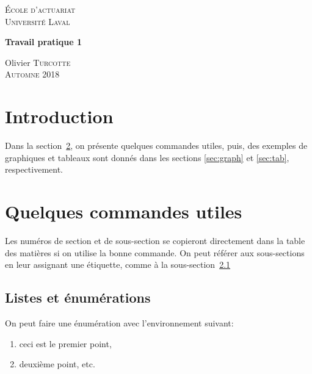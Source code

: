 \documentclass{article}\usepackage[]{graphicx}\usepackage[]{color}
\begin{document}
\thispagestyle{empty}
\begin{center}

\vspace{3cm}

\textsc{\Large École d'actuariat}\\
\textsc{\Large Université Laval}\\[0.5cm]

\vspace{5cm}

{ \LARGE \bfseries Travail pratique 1  \\ }

\vfill

\Large Olivier \textsc{Turcotte}\\
{\Large \textsc{Automne} 2018}

\end{center}
\newpage
\tableofcontents

\newpage

\section{Introduction}

Dans la section~\ref{sec:commandes}, on présente quelques commandes utiles, puis, des exemples de graphiques et tableaux sont donnés dans les sections \ref{sec:graph} et \ref{sec:tab}, respectivement.

\section{Quelques commandes utiles} 
\label{sec:commandes}

Les numéros de section et de sous-section se copieront directement dans la table des matières si on utilise la bonne commande. On peut référer aux sous-sections en leur assignant une étiquette, comme à la sous-section~\ref{ssec:listes}

\subsection{Listes et énumérations}
\label{ssec:listes}

On peut faire une énumération avec l'environnement suivant:

\begin{enumerate}
\item ceci est le premier point,

\item deuxième point, etc.
\end{enumerate}
\end{document}
